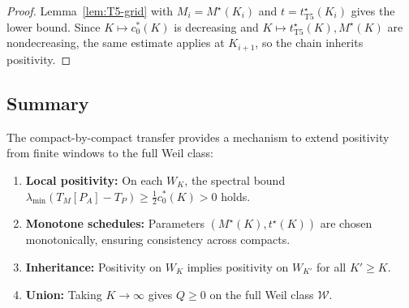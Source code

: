 \begin{proof}
Lemma~\ref{lem:T5-grid} with $M_i = M^\star(K_i)$ and $t = t^\star_{\mathrm{T5}}(K_i)$ gives the lower bound. Since $K \mapsto c_0^\ast(K)$ is decreasing and $K \mapsto t^\star_{\mathrm{T5}}(K), M^\star(K)$ are nondecreasing, the same estimate applies at $K_{i+1}$, so the chain inherits positivity.
\end{proof}

\subsection{Summary}

The compact-by-compact transfer provides a mechanism to extend positivity from finite windows to the full Weil class:

\begin{enumerate}
  \item \textbf{Local positivity:} On each $W_K$, the spectral bound $\lambda_{\min}(T_M[P_A] - T_P) \geq \tfrac{1}{2} c_0^\ast(K) > 0$ holds.

  \item \textbf{Monotone schedules:} Parameters $(M^\star(K), t^\star(K))$ are chosen monotonically, ensuring consistency across compacts.

  \item \textbf{Inheritance:} Positivity on $W_K$ implies positivity on $W_{K'}$ for all $K' \geq K$.

  \item \textbf{Union:} Taking $K \to \infty$ gives $Q \geq 0$ on the full Weil class $\mathcal{W}$.
\end{enumerate}
